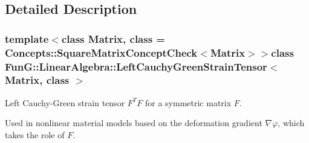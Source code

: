 \subsection{Detailed Description}
\subsubsection*{template$<$class Matrix, class = Concepts\-::\-Square\-Matrix\-Concept\-Check$<$\-Matrix$>$$>$class Fun\-G\-::\-Linear\-Algebra\-::\-Left\-Cauchy\-Green\-Strain\-Tensor$<$ Matrix, class $>$}

Left Cauchy-\/\-Green strain tensor $ F^T F $ for a symmetric matrix $ F $. 

Used in nonlinear material models based on the deformation gradient $\nabla\varphi$, which takes the role of $F$. 

